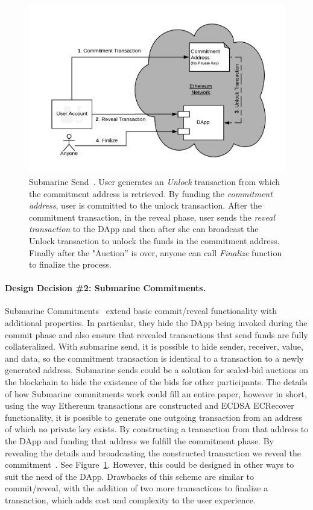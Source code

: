 \begin{figure}[t]
\centering
\includegraphics[width=0.5\linewidth]{figures/LibSubmarine.png}
\caption{\scriptsize Submarine Send~\cite{libsubmarine}. User generates an \textit{Unlock} transaction from which the commitment address is retrieved. By funding the \textit{commitment address}, user is committed to the unlock transaction. After the commitment transaction, in the reveal phase, user sends the \textit{reveal transaction} to the DApp and then after she can broadcast the Unlock transaction to unlock the funds in the commitment address. Finally after the "Auction'' is over, anyone can call \textit{Finalize} function to finalize the process.  \label{fig:LibSubmarine}}
\end{figure}

\paragraph{Design Decision \#2: Submarine Commitments.}\label{submarineCommits}
Submarine Commitments~\cite{breidenbach2018enter, submarinesendHD} extend basic commit/reveal functionality with additional properties. In particular, they hide the DApp being invoked during the commit phase and also ensure that revealed transactions that send funds are fully collateralized. With submarine send, it is possible to hide sender, receiver, value, and data, so the commitment transaction is identical to a transaction to a newly generated address. Submarine sends could be a solution for sealed-bid auctions on the blockchain to hide the existence of the bids for other participants. The details of how Submarine commitments work could fill an entire paper, however in short, using the way Ethereum transactions are constructed and ECDSA ECRecover functionality, it is possible to generate one outgoing transaction from an address of which no private key exists. By constructing a transaction from that address to the DApp and funding that address we fulfill the commitment phase. By revealing the details and broadcasting the constructed transaction we reveal the commitment~\cite{libsubmarine}. See Figure~\ref{fig:LibSubmarine}. However, this could be designed in other ways to suit the need of the DApp. Drawbacks of this scheme are similar to commit/reveal, with the addition of two more transactions to finalize a transaction, which adds cost and complexity to the user experience.

